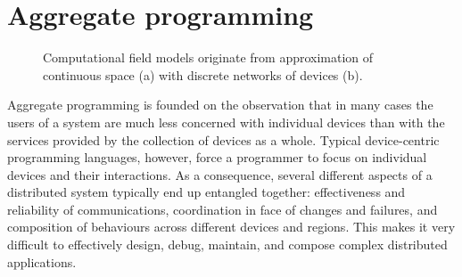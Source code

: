 \documentclass[12pt,a4paper,twoside,openright]{book}
\begin{document}
\section{Aggregate programming}

\begin{figure}
\centering
{}
\hspace{0.01\columnwidth}
\caption{Computational field models originate from approximation of continuous
space (a) with discrete networks of devices (b).}
\label{img:space}
\end{figure}

Aggregate programming is founded on the observation that in many cases the users of a system are much less concerned with individual devices than with the services provided by the collection of devices as a whole.
%
Typical device-centric programming languages, however, force a programmer to focus on individual devices and their interactions.
%
As a consequence, several different aspects of a distributed system typically end up entangled together: effectiveness and reliability of communications, coordination in face of changes and failures, and composition of behaviours across different devices and regions.
%
This makes it very difficult to effectively design, debug, maintain, and compose complex distributed applications.
\end{document}

